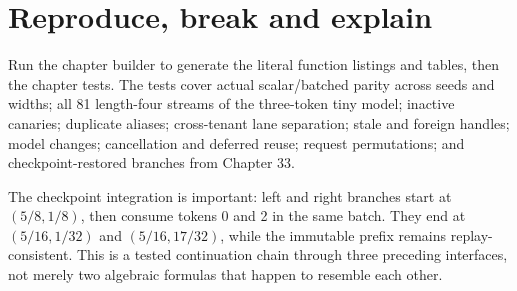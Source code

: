 \section{Reproduce, break and explain}
\label{evod34:validation}
Run the chapter builder to generate the literal function listings and tables,
then the chapter tests. The tests cover actual scalar/batched parity across
seeds and widths; all 81 length-four streams of the three-token tiny model;
inactive canaries; duplicate aliases; cross-tenant lane separation; stale and
foreign handles; model changes; cancellation and deferred reuse; request
permutations; and checkpoint-restored branches from Chapter 33.

The checkpoint integration is important: left and right branches start at
$(5/8,1/8)$, then consume tokens 0 and 2 in the same batch. They end at
$(5/16,1/32)$ and $(5/16,17/32)$, while the immutable prefix remains
replay-consistent. This is a tested continuation chain through three preceding
interfaces, not merely two algebraic formulas that happen to resemble each other.

